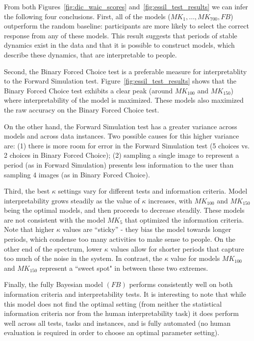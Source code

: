 \documentclass[letterpaper]{article}
\begin{document}
From both Figures~\ref{fig:dic_waic_scores} and~\ref{fig:essil_test_results} we can infer the following four conclusions.
First, all of the models ($MK_{1},\ldots,MK_{700}, FB$) outperform the random baseline: participants are more likely to select the correct response from any of these models. This result suggests that periods of stable dynamics  exist in the data and that it is possible to construct models, which describe these dynamics, that are interpretable to people.

Second, the Binary Forced Choice test is a preferable measure for interpretablity   to the Forward Simulation test. Figure~\ref{fig:essil_test_results} shows that the Binary Forced Choice test exhibits a clear peak (around $MK_{100}$ and $MK_{150}$) where interpretability of the model is maximized.
These models also maximized the  raw accuracy on the Binary Forced Choice test.

On the other hand, the Forward Simulation test has a greater variance across models and across data instances.
Two possible causes for this higher variance are: (1) there is more room for error in the Forward Simulation test (5 choices vs. 2 choices in Binary Forced Choice); (2) sampling a single image to represent a period (as in Forward Simulation) presents less information to the user than sampling 4 images (as in Binary Forced Choice).

Third, the best $\kappa$ settings vary for different tests and information criteria.
Model interpretability grows steadily as the value of $\kappa$ increases, with $MK_{100}$ and $MK_{150}$ being the optimal models, and then proceeds to decrease steadily.
These models are not consistent with the model $MK_5$ that optimized the information criteria.
Note that higher $\kappa$ values are ``sticky'' - they  bias the model towards longer periods, which condense too many activities to make sense to people.
On the other end of the spectrum, lower $\kappa$ values allow for shorter periods that capture too much of the noise in the system.
In contrast, the $\kappa$ value for  models $MK_{100}$ and $MK_{150}$
represent a ``sweet spot" in between these two extremes.


Finally, the fully Bayesian model $(FB)$ performs consistently well on both information criteria and interpretability tests. It is interesting to note that while this model does not find the optimal setting (from neither the statistical information criteria nor from the human interpretability task) it does perform well across all tests, tasks and instances, and is fully automated (no human evaluation is required in order to choose an optimal parameter setting).
\end{document}
